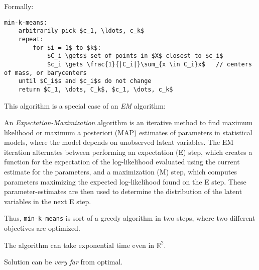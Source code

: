 Formally:
\begin{lstlisting}[caption={Lloyd's algorithm}, label={lst:lloyds}]
min-k-means:
    arbitrarily pick $c_1, \ldots, c_k$
    repeat:
        for $i = 1$ to $k$:
            $C_i \gets$ set of points in $X$ closest to $c_i$
            $c_i \gets \frac{1}{|C_i|}\sum_{x \in C_i}x$   // centers of mass, or barycenters
    until $C_i$s and $c_i$s do not change
    return $C_1, \dots, C_k$, $c_1, \dots, c_k$
\end{lstlisting}

This algorithm is a special case of an \emph{EM} algorithm:
\begin{defn}[EM]
    An \emph{Expectation-Maximization} algorithm is an iterative method to find maximum likelihood or maximum a posteriori (MAP) estimates of parameters in statistical models, where the model depends on unobserved latent variables. The EM iteration alternates between performing an expectation (E) step, which creates a function for the expectation of the log-likelihood evaluated using the current estimate for the parameters, and a maximization (M) step, which computes parameters maximizing the expected log-likelihood found on the E step. These parameter-estimates are then used to determine the distribution of the latent variables in the next E step.
\end{defn}

Thus, \texttt{min-k-means} is sort of a greedy algorithm in two steps, where two different objectives are optimized.

\begin{obs}\label{obs:k-means-1}
    The algorithm can take exponential time even in $\mathbb{R}^2$.
\end{obs}
\begin{obs}\label{obs:k-means-2}
    Solution can be \emph{very far} from optimal.
\end{obs}

